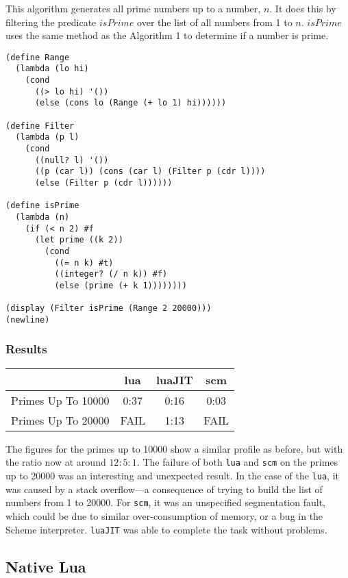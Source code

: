 This algorithm generates all prime numbers up to a number, $n$. It does this by
filtering the predicate $isPrime$ over the list of all numbers from 1 to $n$.
$isPrime$ uses the same method as the Algorithm 1 to determine if a number is
prime.
\begin{framed}
\begin{verbatim}
(define Range
  (lambda (lo hi)
    (cond
      ((> lo hi) '())
      (else (cons lo (Range (+ lo 1) hi))))))

(define Filter
  (lambda (p l)
    (cond
      ((null? l) '())
      ((p (car l)) (cons (car l) (Filter p (cdr l))))
      (else (Filter p (cdr l))))))

(define isPrime
  (lambda (n)
    (if (< n 2) #f
      (let prime ((k 2))
        (cond
          ((= n k) #t)
          ((integer? (/ n k)) #f)
          (else (prime (+ k 1))))))))

(display (Filter isPrime (Range 2 20000)))
(newline)
\end{verbatim}
\end{framed}

\subsubsection{Results}

\begin{center}
\begin{tabular}{|l|c|c|c|}
\hline
& lua & luaJIT & scm \\
\hline
Primes Up To 10000 & 0:37 & 0:16 & 0:03 \\ \hline
Primes Up To 20000 & FAIL & 1:13 & FAIL \\ \hline
\end{tabular}
\end{center}
The figures for the primes up to 10000 show a similar profile as before, but
with the ratio now at around $12:5:1$. The failure of both \texttt{lua} and
\texttt{scm} on the primes up to 20000 was an interesting and unexpected result.
In the case of the \texttt{lua}, it was caused by a stack overflow---a
consequence of trying to build the list of numbers from 1 to 20000. For
\texttt{scm}, it was an unspecified segmentation fault, which could be due to
similar over-consumption of memory, or a bug in the Scheme interpreter.
\texttt{luaJIT} was able to complete the task without problems.

\subsection{Native Lua}

